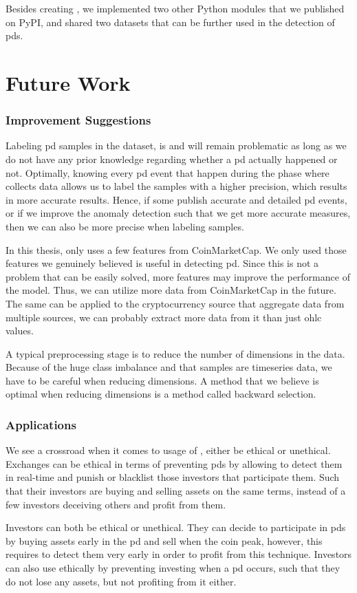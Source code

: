Besides creating \project, we implemented two other Python modules that we published on PyPI, and shared two datasets that can be further used in the detection of \acp{pd}.

\section{Future Work}

\subsubsection{Improvement Suggestions}
Labeling \ac{pd} samples in the dataset, is and will remain problematic as long as we do not have any prior knowledge regarding whether a \ac{pd} actually happened or not. Optimally, knowing every \ac{pd} event that happen during the phase where \project collects data allows us to label the samples with a higher precision, which results in more accurate results. Hence, if some publish accurate and detailed \ac{pd} events, or if we improve the anomaly detection such that we get more accurate measures, then we can also be more precise when labeling samples.

In this thesis, \project only uses a few features from CoinMarketCap. We only used those features we genuinely believed is useful in detecting \ac{pd}. Since this is not a problem that can be easily solved, more features may improve the performance of the model. Thus, we can utilize more data from CoinMarketCap in the future. The same can be applied to the cryptocurrency source that aggregate data from multiple sources, we can probably extract more data from it than just \ac{ohlc} values.

A typical preprocessing stage is to reduce the number of dimensions in the data. Because of the huge class imbalance and that samples are timeseries data, we have to be careful when reducing dimensions. A method that we believe is optimal when reducing dimensions is a method called backward selection.

\subsubsection{Applications}
We see a crossroad when it comes to usage of \project, either be ethical or unethical. Exchanges can be ethical in terms of preventing \acp{pd} by allowing \project to detect them in real-time and punish or blacklist those investors that participate them. Such that their investors are buying and selling assets on the same terms, instead of a few investors deceiving others and profit from them. 

Investors can both be ethical or unethical. They can decide to participate in \acp{pd} by buying assets early in the \ac{pd} and sell when the coin peak, however, this requires \project to detect them very early in order to profit from this technique. Investors can also use \project ethically by preventing investing when a \ac{pd} occurs, such that they do not lose any assets, but not profiting from it either.